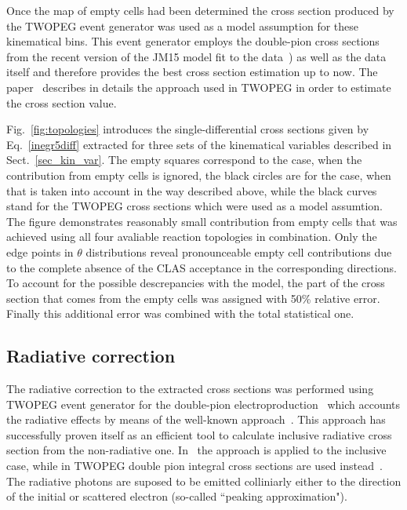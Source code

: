 \documentclass[prc,twocolumn,superscriptaddress,showpacs,amssymb,amsmath,amsfonts,linenumbers,aps]{revtex4-1}
\begin{document}
Once the map of empty cells had been determined the cross section produced by the TWOPEG event  generator was used as a model assumption for these kinematical bins. 
This event generator employs the double-pion cross sections from the recent version of the JM15 model fit to the data~\cite{Ripani:2002ss,Mokeev:2012vsa,Fedotov:2008aa,Golovach:note}) as well as the data~\cite{Wu:2005wf,ABBHHM:1968aa} itself and therefore provides the best cross section estimation up to now.
The paper~\cite{Skorodum:EG} describes in details the approach used in TWOPEG in order to estimate the cross section value. 



Fig.~\ref{fig:topologies} introduces the single-differential cross sections given by Eq.~\eqref{inegr5diff} extracted for three sets of the kinematical variables described in Sect.~\ref{sec_kin_var}.  The empty squares correspond to the case, when the contribution from empty cells is ignored, the  black circles are for the case, when that is taken into account in the way described above, while the black curves stand for the TWOPEG cross sections which were used as a model assumtion. The figure demonstrates reasonably small contribution from empty cells that was achieved using all four avaliable reaction topologies in combination. Only the edge points in $\theta$ distributions reveal pronounceable empty cell contributions  due to the complete absence of the CLAS acceptance in the corresponding directions. 
To account for the possible descrepancies with the model, the part of the cross section that comes from the empty cells was assigned with 50\% relative error. Finally this additional error was combined with the total statistical one. 






\subsection{Radiative correction}
\label{rad_corr}


The radiative correction to the extracted cross sections was performed using TWOPEG event generator for the double-pion electroproduction~\cite{Skorodum:EG} which accounts the radiative effects by means of the well-known approach~\cite{Mo:1968cg}. 
This approach has successfully proven itself as an efficient tool to calculate inclusive radiative cross section from the non-radiative one.
In~\cite{Mo:1968cg} the approach is applied to the inclusive case, while in TWOPEG double pion integral cross sections are used instead~\cite{Skorodum:EG}. The radiative photons are suposed to be emitted colliniarly either to the direction of the initial or scattered electron (so-called ``peaking approximation").
\end{document}
